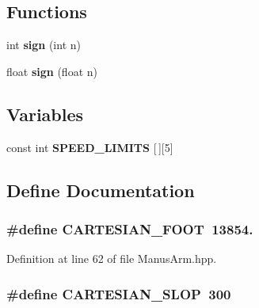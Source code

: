 \subsection*{\-Functions}
\begin{DoxyCompactItemize}
\item 
int {\bf sign} (int n)
\item 
float {\bf sign} (float n)
\end{DoxyCompactItemize}
\subsection*{\-Variables}
\begin{DoxyCompactItemize}
\item 
const int {\bf \-S\-P\-E\-E\-D\-\_\-\-L\-I\-M\-I\-T\-S} [$\,$][5]
\end{DoxyCompactItemize}


\subsection{\-Define \-Documentation}
\subsubsection[{\-C\-A\-R\-T\-E\-S\-I\-A\-N\-\_\-\-F\-O\-O\-T}]{\setlength{\rightskip}{0pt plus 5cm}\#define {\bf \-C\-A\-R\-T\-E\-S\-I\-A\-N\-\_\-\-F\-O\-O\-T}~13854.}\label{ManusArm_8hpp_a148b505ab6c99cbd4895d8ba33055e9e}


\-Definition at line 62 of file \-Manus\-Arm.\-hpp.

\subsubsection[{\-C\-A\-R\-T\-E\-S\-I\-A\-N\-\_\-\-S\-L\-O\-P}]{\setlength{\rightskip}{0pt plus 5cm}\#define {\bf \-C\-A\-R\-T\-E\-S\-I\-A\-N\-\_\-\-S\-L\-O\-P}~300}\label{ManusArm_8hpp_ad06229aafee4a08b31b8bcfdc78aa918}


